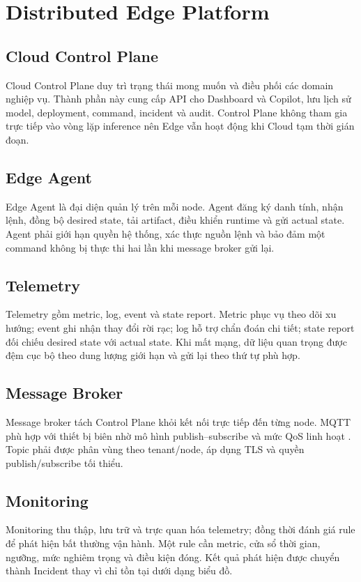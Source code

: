 \section{Distributed Edge Platform}

\subsection{Cloud Control Plane}

Cloud Control Plane duy trì trạng thái mong muốn và điều phối các domain nghiệp
vụ. Thành phần này cung cấp API cho Dashboard và Copilot, lưu lịch sử model,
deployment, command, incident và audit. Control Plane không tham gia trực tiếp
vào vòng lặp inference nên Edge vẫn hoạt động khi Cloud tạm thời gián đoạn.

\subsection{Edge Agent}

Edge Agent là đại diện quản lý trên mỗi node. Agent đăng ký danh tính, nhận lệnh,
đồng bộ desired state, tải artifact, điều khiển runtime và gửi actual state. Agent
phải giới hạn quyền hệ thống, xác thực nguồn lệnh và bảo đảm một command không
bị thực thi hai lần khi message broker gửi lại.

\subsection{Telemetry}

Telemetry gồm metric, log, event và state report. Metric phục vụ theo dõi xu
hướng; event ghi nhận thay đổi rời rạc; log hỗ trợ chẩn đoán chi tiết; state report
đối chiếu desired state với actual state. Khi mất mạng, dữ liệu quan trọng được
đệm cục bộ theo dung lượng giới hạn và gửi lại theo thứ tự phù hợp.

\subsection{Message Broker}

Message broker tách Control Plane khỏi kết nối trực tiếp đến từng node. MQTT phù
hợp với thiết bị biên nhờ mô hình publish--subscribe và mức QoS linh hoạt
\cite{mqtt5}. Topic phải được phân vùng theo tenant/node, áp dụng TLS và quyền
publish/subscribe tối thiểu.

\subsection{Monitoring}

Monitoring thu thập, lưu trữ và trực quan hóa telemetry; đồng thời đánh giá rule
để phát hiện bất thường vận hành. Một rule cần metric, cửa sổ thời gian, ngưỡng,
mức nghiêm trọng và điều kiện đóng. Kết quả phát hiện được chuyển thành Incident
thay vì chỉ tồn tại dưới dạng biểu đồ.